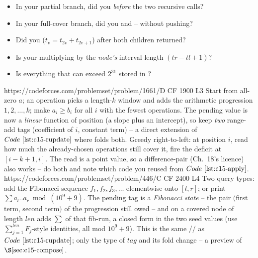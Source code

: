 \begin{stuckbox}
\begin{itemize}[nosep,leftmargin=1.4em]
  \item In your partial branch, did you  \emph{before} the two recursive calls?
  \item In your full-cover branch, did you  and  -- without pushing?
  \item Did you  (\(t_v=t_{2v}+t_{2v+1}\)) after both children returned?
  \item Is your  multiplying by the \emph{node's} interval length \((tr-tl+1)\)?
  \item Is everything that can exceed \(2^{31}\) stored in ?
\end{itemize}
\end{stuckbox}

\begin{practiceset}
    {https://codeforces.com/problemset/problem/1661/D}
    {CF 1900 L3}
    {Start from all-zero \(a\); an operation picks a length-\(k\) window and adds the arithmetic progression \(1,2,\dots,k\); make \(a_i\ge b_i\) for all \(i\) with the fewest operations.  The pending value is now a \emph{linear} function of position (a slope plus an intercept), so keep \emph{two} range-add tags (coefficient of \(i\), constant term) -- a direct extension of \(\coderef{c15-rupdate}\) where  folds both.  Greedy right-to-left: at position \(i\), read how much the already-chosen operations still cover it, fire the deficit at \([i-k+1,i]\).  The read is a point value, so a difference-pair (Ch.~18's licence) also works -- do both and note which code you reused from \(\coderef{c15-apply}\).}
    {https://codeforces.com/problemset/problem/446/C}
    {CF 2400 L4}
    {Two query types: add the Fibonacci sequence \(f_1,f_2,f_3,\dots\) elementwise onto \([l,r]\); or print \(\sum a_l..a_r\bmod(10^9{+}9)\).  The pending tag is a \emph{Fibonacci state} -- the pair \((\)first term, second term\()\) of the progression still owed -- and  on a covered node of length \(\mathit{len}\) adds \(\sum\) of that fib-run, a closed form in the two seed values (use \(\sum_{j=1}^{\mathit{len}} F_j\)-style identities, all mod \(10^9{+}9\)).  This is the same // as \(\coderef{c15-rupdate}\); only the type of \(\mathit{tag}\) and its fold change -- a preview of \(\secref{c15-compose}\).}
\end{practiceset}

